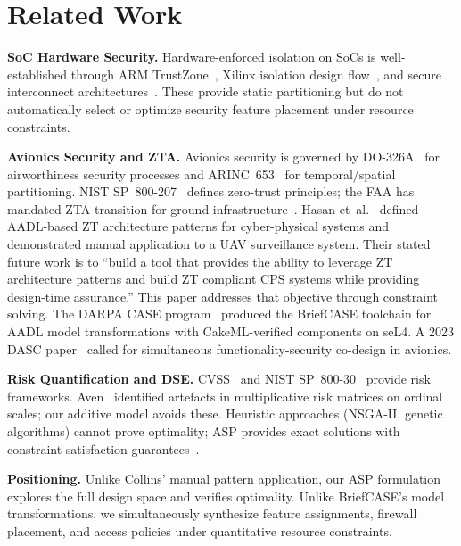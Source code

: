 \documentclass[conference]{IEEEtran}
\begin{document}
\section{Related Work}

\textbf{SoC Hardware Security.}
Hardware-enforced isolation on SoCs is well-established through ARM
TrustZone~\cite{arm_tz}, Xilinx isolation design flow~\cite{xilinx_idf},
and secure interconnect architectures~\cite{fiorin_noc}. These provide
static partitioning but do not automatically select or optimize security
feature placement under resource constraints.

\textbf{Avionics Security and ZTA.}
Avionics security is governed by DO-326A~\cite{do326a} for airworthiness
security processes and ARINC~653~\cite{arinc653} for temporal/spatial
partitioning. NIST SP~800-207~\cite{nist_zta} defines zero-trust
principles; the FAA has mandated ZTA transition for ground
infrastructure~\cite{faa_zt}. Hasan et~al.~\cite{hasan_saecps,hasan_jsys}
defined AADL-based ZT architecture patterns for cyber-physical systems and
demonstrated manual application to a UAV surveillance system. Their stated
future work is to ``build a tool that provides the ability to leverage ZT
architecture patterns and build ZT compliant CPS systems while providing
design-time assurance.'' This paper addresses that objective through
constraint solving. The DARPA CASE program~\cite{darpa_case} produced
the BriefCASE toolchain for AADL model transformations with
CakeML-verified components on seL4. A 2023 DASC paper~\cite{ztas_dasc}
called for simultaneous functionality-security co-design in avionics.

\textbf{Risk Quantification and DSE.}
CVSS~\cite{cvss} and NIST SP~800-30~\cite{nist_sp80030} provide risk
frameworks. Aven~\cite{aven_riskmatrix} identified artefacts in
multiplicative risk matrices on ordinal scales; our additive model avoids
these. Heuristic approaches (NSGA-II, genetic algorithms) cannot prove
optimality; ASP provides exact solutions with constraint satisfaction
guarantees~\cite{gebser_asp}.

\textbf{Positioning.}
Unlike Collins' manual pattern application, our ASP formulation explores the
full design space and verifies optimality. Unlike BriefCASE's model
transformations, we simultaneously synthesize feature assignments, firewall
placement, and access policies under quantitative resource constraints.

\end{document}
